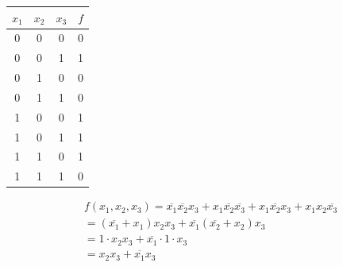 \documentclass[12pt,openany]{book}
\begin{document}
			      
				  \begin{minipage}{0.4\textwidth}
						\begin{center}
					      		\begin{tabular}{|c|c|c|c|}
					      			\hline
					      			\( x_1 \) & \( x_2 \) & \( x_3 \) & \( f \) \\
					      			\hline
					      			0         & 0         & 0         & 0       \\
					      			\hline
					      			\rowcolor{blue!25}
					      			0         & 0         & 1         & 1       \\
					      			\hline
					      			0         & 1         & 0         & 0       \\
					      			\hline
					      			0         & 1         & 1         & 0       \\
					      			\hline
					      			\rowcolor{blue!25}
					      			1         & 0         & 0         & 1       \\
					      			\hline
					      			\rowcolor{blue!25}
					      			1         & 0         & 1         & 1       \\
					      			\hline
					      			\rowcolor{blue!25}
					      			1         & 1         & 0         & 1       \\
					      			\hline
					      			1         & 1         & 1         & 0       \\
					      			\hline
					      		\end{tabular}
					      	\end{center}
		    
				  \end{minipage}
				  \hfill
				  \hspace*{-20px}
				  \vline
				  \hfill
				  \hspace*{20px}
				  \begin{minipage}{0.4\textwidth}


					  \begin{align*}
					  & f(x_1, x_2, x_3) = \overline{x_1} \overline{x_2} x_3 + x_1 \overline{x_2} \overline{x_3} + x_1 \overline{x_2} x_3 + x_1 x_2 \overline{x_3} \\
					& = (\overline{x_1} + x_1) x_2 x_3 + \overline{x_1} (\overline{x_2} + x_2) x_3                                                               \\
				& = 1 \cdot x_2 x_3 + \overline{x_1} \cdot 1 \cdot x_3                                                                                       \\
			& = x_2 x_3 + \overline{x_1} x_3                                                                                                             
		\end{align*}

	\end{minipage}
			      	
\end{document}
